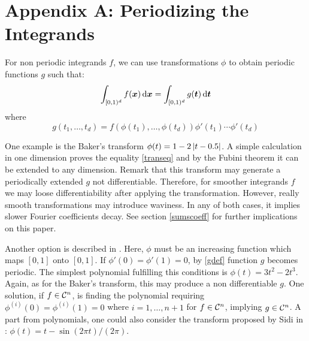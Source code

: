 \documentclass[graybox,footinfo]{svmult}
\newcommand{\bst}{\boldsymbol{t}}    %
\newcommand{\bsx}{\boldsymbol{x}}    %
\begin{document}
\section*{Appendix A: Periodizing the Integrands}\label{periodizing}
For non periodic integrands $f$, we can use transformations $\phi$ to obtain periodic functions $g$ such that:
\begin{equation}\label{transeq}
\int_{\cube} f(\bsx)  \, \dif \bsx=\int_{\cube} g(\bst)  \, \dif \bst
\end{equation}
where
\begin{equation}\label{gdef}
g(t_1,\dots,t_d)=f(\phi(t_1),\dots,\phi(t_d))\phi'(t_1)\cdots\phi'(t_d)
\end{equation}

One example is the Baker's transform $\phi(t)=1-2\left | t-0.5 \right |$. A simple calculation in one dimension proves the equality \eqref{transeq} and by the Fubini theorem it can be extended to any dimension. Remark that this transform may generate a periodically extended $g$ not differentiable. Therefore, for smoother integrands $f$ we may loose differentiability after applying the transformation. However, really smooth transformations may introduce waviness. In any of both cases, it implies slower Fourier coefficients decay. See section \eqref{sumscoeff} for further implications on this paper.

Another option is described in \cite{SloJoe94}. Here, $\phi$ must be an increasing function which maps $[0,1]$ onto $[0,1]$. If $\phi'(0)=\phi'(1)=0$, by \eqref{gdef} function $g$ becomes periodic. The simplest polynomial fulfilling this conditions is $\phi(t)=3t^2-2t^3$. Again, as for the Baker's transform, this may produce a non differentiable $g$. One solution, if $f\in\mathcal{C}^n$, is finding the polynomial requiring $\phi^{(i)}(0)=\phi^{(i)}(1)=0$  where $i=1,\dots,n+1$ for $f\in\mathcal{C}^n$, implying $g\in\mathcal{C}^n$. A part from polynomials, one could also consider the transform proposed by Sidi in \cite{sidi1993new}: $\phi(t)=t-\sin(2\pi t)/(2\pi)$.
\end{document}
